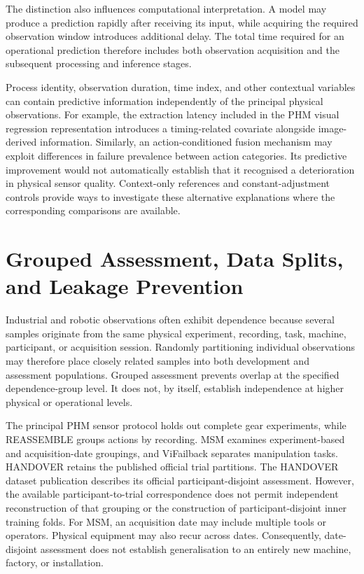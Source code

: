 The distinction also influences computational interpretation. A model may produce a prediction rapidly after receiving its input, while acquiring the required observation window introduces additional delay. The total time required for an operational prediction therefore includes both observation acquisition and the subsequent processing and inference stages.

Process identity, observation duration, time index, and other contextual variables can contain predictive information independently of the principal physical observations. For example, the extraction latency included in the PHM visual regression representation introduces a timing-related covariate alongside image-derived information. Similarly, an action-conditioned fusion mechanism may exploit differences in failure prevalence between action categories. Its predictive improvement would not automatically establish that it recognised a deterioration in physical sensor quality. Context-only references and constant-adjustment controls provide ways to investigate these alternative explanations where the corresponding comparisons are available.

\section{Grouped Assessment, Data Splits, and Leakage Prevention}
\label{sec:ch4-assessment}

Industrial and robotic observations often exhibit dependence because several samples originate from the same physical experiment, recording, task, machine, participant, or acquisition session. Randomly partitioning individual observations may therefore place closely related samples into both development and assessment populations. Grouped assessment prevents overlap at the specified dependence-group level. It does not, by itself, establish independence at higher physical or operational levels.

The principal PHM sensor protocol holds out complete gear experiments, while REASSEMBLE groups actions by recording. MSM examines experiment-based and acquisition-date groupings, and ViFailback separates manipulation tasks. HANDOVER retains the published official trial partitions. The HANDOVER dataset publication describes its official participant-disjoint assessment. However, the available participant-to-trial correspondence does not permit independent reconstruction of that grouping or the construction of participant-disjoint inner training folds. For MSM, an acquisition date may include multiple tools or operators. Physical equipment may also recur across dates. Consequently, date-disjoint assessment does not establish generalisation to an entirely new machine, factory, or installation.

